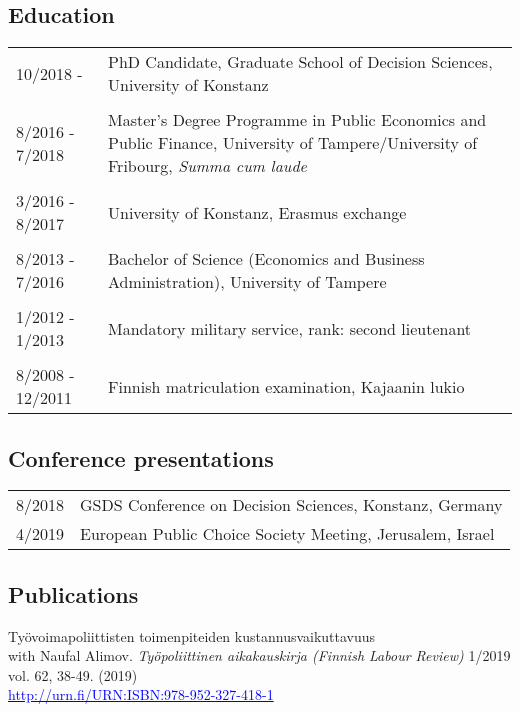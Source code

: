 \documentclass[16pt]{article}
\begin{document}
\subsection*{Education}
\begin{tabular}{@{}p{1.5in}p{5in}}
10/2018 -          & PhD Candidate, Graduate School of Decision Sciences, University of Konstanz \\
                        
\\
8/2016 - 7/2018 & Master's Degree Programme in Public Economics and Public Finance, University of Tampere/University of Fribourg, \textit{Summa cum laude}\\
\\
3/2016 - 8/2017 & University of Konstanz, Erasmus exchange \\
\\
8/2013 - 7/2016 & Bachelor of Science (Economics and Business Administration), University of Tampere\\
\\
1/2012 - 1/2013 & Mandatory military service, rank: second lieutenant\\
\\
8/2008 - 12/2011 & Finnish matriculation examination, Kajaanin lukio
\end{tabular}

\subsection*{Conference presentations}
\begin{tabular}{@{}p{1.5in}p{5in}}
8/2018             & GSDS Conference on Decision Sciences, Konstanz, Germany\\
4/2019             & European Public Choice Society Meeting, Jerusalem, Israel\\
\end{tabular}

\subsection*{Publications}

\noindent Ty\"{o}voimapoliittisten toimenpiteiden kustannusvaikuttavuus \\
\noindent with Naufal Alimov. \textit{Ty\"{o}poliittinen aikakauskirja (Finnish Labour Review)} 1/2019 vol. 62, 38-49.  (2019) \\
\noindent \href{http://urn.fi/URN:ISBN:978-952-287-645-4}{\textcolor{blue}{http://urn.fi/URN:ISBN:978-952-327-418-1}} \\
\end{document}
